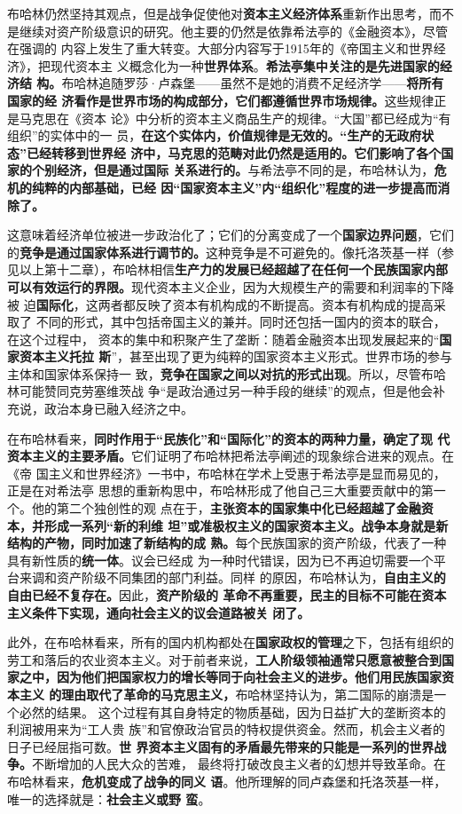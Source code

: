 布哈林仍然坚持其观点，但是战争促使他对\textbf{资本主义经济体系}重新作出思考，而不
是继续对资产阶级意识的研究。他主要的仍然是依靠希法亭的《金融资本》，尽管在强调的
内容上发生了重大转变。大部分内容写于1915年的《帝国主义和世界经济》，把现代资本主
义概念化为一种\textbf{世界体系}。\textbf{希法亭集中关注的是先进国家的经济结
  构。}布哈林追随罗莎·卢森堡——虽然不是她的消费不足经济学——\textbf{将所有国家的经
  济看作是世界市场的构成部分，它们都遵循世界市场规律。}这些规律正是马克思在《资本
论》中分析的资本主义商品生产的规律。“大国”都已经成为“有组织”的实体中的一
员，\textbf{在这个实体内，价值规律是无效的。“生产的无政府状态”已经转移到世界经
  济中，马克思的范畴对此仍然是适用的。它们影响了各个国家的个别经济，但是通过国际
  关系进行的。}与希法亭不同的是，布哈林认为，\textbf{危机的纯粹的内部基础，已经
  因“国家资本主义”内“组织化”程度的进一步提高而消除了。}

这意味着经济单位被进一步政治化了；它们的分离变成了一个\textbf{国家边界问题}，它们
的\textbf{竞争是通过国家体系进行调节的。}这种竞争是不可避免的。像托洛茨基一样（参
见以上第十二章），布哈林相信\textbf{生产力的发展已经超越了在任何一个民族国家内部
  可以有效运行的界限。}现代资本主义企业，因为大规模生产的需要和利润率的下降被
迫\textbf{国际化}，这两者都反映了资本有机构成的不断提高。资本有机构成的提高采取了
不同的形式，其中包括帝国主义的兼并。同时还包括一国内的资本的联合，在这个过程中，
资本的集中和积聚产生了垄断：随着金融资本出现发展起来的“\textbf{国家资本主义托拉
  斯}”，甚至出现了更为纯粹的国家资本主义形式。世界市场的参与主体和国家体系保持一
致，\textbf{竞争在国家之间以对抗的形式出现}。所以，尽管布哈林可能赞同克劳塞维茨战
争“是政治通过另一种手段的继续”的观点，但是他会补充说，政治本身已融入经济之中。

在布哈林看来，\textbf{同时作用于“民族化”和“国际化”的资本的两种力量，确定了现
  代资本主义的主要矛盾。}它们证明了布哈林把希法亭阐述的现象综合进来的观点。在《帝
国主义和世界经济》一书中，布哈林在学术上受惠于希法亭是显而易见的，正是在对希法亭
思想的重新构思中，布哈林形成了他自己三大重要贡献中的第一个。他的第二个独创性的观
点在于，\textbf{主张资本的国家集中化已经超越了金融资本，并形成一系列“新的利维
  坦”或准极权主义的国家资本主义。战争本身就是新结构的产物，同时加速了新结构的成
  熟。}每个民族国家的资产阶级，代表了一种具有新性质的\textbf{统一体}。议会已经成
为一种时代错误，因为已不再迫切需要一个平台来调和资产阶级不同集团的部门利益。同样
的原因，布哈林认为，\textbf{自由主义的自由已经不复存在。}因此，\textbf{资产阶级的
  革命不再重要，民主的目标不可能在资本主义条件下实现，通向社会主义的议会道路被关
  闭了。}

此外，在布哈林看来，所有的国内机构都处在\textbf{国家政权的管理}之下，包括有组织的
劳工和落后的农业资本主义。对于前者来说，\textbf{工人阶级领袖通常只愿意被整合到国
  家之中，因为他们把国家权力的增长等同于向社会主义的进步。他们用民族国家资本主义
  的理由取代了革命的马克思主义，}布哈林坚持认为，第二国际的崩溃是一个必然的结果。
这个过程有其自身特定的物质基础，因为日益扩大的垄断资本的利润被用来为“工人贵
族”和官僚政治官员的特权提供资金。然而，机会主义者的日子已经屈指可数。\textbf{世
  界资本主义固有的矛盾最先带来的只能是一系列的世界战争。}不断增加的人民大众的苦难，
最终将打破改良主义者的幻想并导致革命。在布哈林看来，\textbf{危机变成了战争的同义
  语}。他所理解的同卢森堡和托洛茨基一样，唯一的选择就是：\textbf{社会主义或野
  蛮}。

